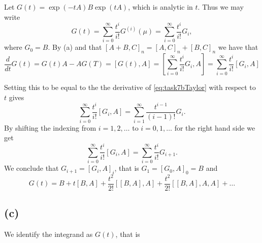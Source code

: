 Let $G(t) = \exp(-tA)B\exp(tA)$, which is analytic in $t$. Thus we may write
\begin{equation}
  \label{eq:task7bTaylor}
G(t) = \sum\limits_{i = 0}^{\infty}\frac{t^{i}}{i!} G^{(i)}(\mu)=\sum\limits_{i = 0}^{\infty}\frac{t^{i}}{i!} G_{i},
\end{equation}
where $G_{0} = B$.
By (a) and that $[A+B,C]_{n} = [A,C]_{n} + [B,C]_{n}$ we have that
\begin{equation}
  \frac{d}{dt}G(t) = G(t)A-AG(T) = [G(t),A]=\left[\sum\limits_{i = 0}^{\infty}\frac{t^{i}}{i!} G_{i},A\right] = \sum\limits_{i = 0}^{\infty}\frac{t^{i}}{i!} [G_{i},A]
\end{equation}



 Setting this to be equal to the the derivative of \eqref{eq:task7bTaylor} with respect to $t$ gives
\begin{equation}
\sum\limits_{i = 0}^{\infty}\frac{t^{i}}{i!} [G_{i},A] = \sum\limits_{i = 1}^{\infty}\frac{t^{i-1}}{(i-1)!} G_{i}.
\end{equation}
By shifting the indexing from $i = 1,2,\ldots $ to $i = 0,1,\ldots$ for the right hand side we get
\begin{equation}
\sum\limits_{i = 0}^{\infty}\frac{t^{i}}{i!} [G_{i},A] = \sum\limits_{i = 0}^{\infty}\frac{t^{i}}{i!} G_{i+1}.
\end{equation}
We conclude that $G_{i+1} = [G_{i},A]_{i}$, that is $G_{1} = [G_{0},A]_{0} = B$ and
\begin{equation}
  G(t) = B + t[B,A]+\frac{t^{2}}{2!}[[B,A],A]+\frac{t^{2}}{2!}[[B,A],A,A]+\ldots
\end{equation}

\subsection*{(c)}
We identify the integrand as $G(t)$, that is

